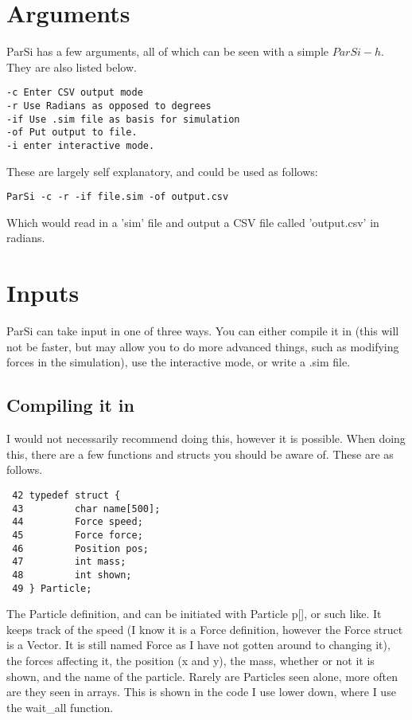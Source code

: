 \documentclass[11pt]{article}
\begin{document}
\section {Arguments}
ParSi has a few arguments, all of which can be seen with a simple \(ParSi  -h\). They are also listed below.
\begin{lstlisting}
-c Enter CSV output mode
-r Use Radians as opposed to degrees
-if Use .sim file as basis for simulation
-of Put output to file.
-i enter interactive mode.
\end{lstlisting}
These are largely self explanatory, and could be used as follows:
\begin{lstlisting}
ParSi -c -r -if file.sim -of output.csv
\end{lstlisting}
Which would read in a 'sim' file and output a CSV file called 'output.csv' in radians.

\section{Inputs}
ParSi can take input in one of three ways. You can either compile it in (this will not be faster, but may allow you to do more advanced things, such as modifying forces in the simulation), use the interactive mode, or write a .sim file.
\subsection {Compiling it in}
I would not necessarily recommend doing this, however it is possible. When doing this, there are a few functions and structs you should be aware of. These are as follows.
\begin{lstlisting}
 42 typedef struct {
 43         char name[500];
 44         Force speed;
 45         Force force;
 46         Position pos;
 47         int mass;
 48         int shown;
 49 } Particle;
\end{lstlisting}
The Particle definition, and can be initiated with Particle p[], or such like. It keeps track of the speed (I know it is a Force definition, however the Force struct is a Vector. It is still named Force as I have not gotten around to changing it), the forces affecting it, the position (x and y), the mass, whether or not it is shown, and the name of the particle. \newline
Rarely are Particles seen alone, more often are they seen in arrays. This is shown in the code I use lower down, where I use the wait\_all function.
\end{document}
